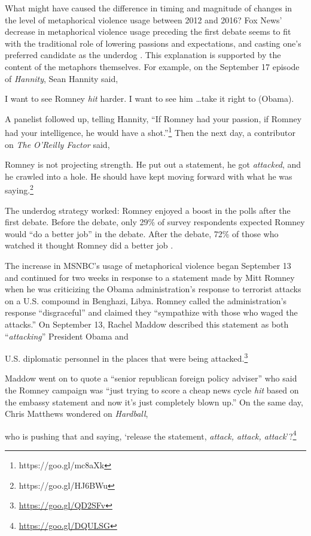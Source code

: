 What might have caused the difference in timing and magnitude of changes in
the level of metaphorical violence usage between 2012 and 2016? Fox News' 
decrease in metaphorical violence usage preceding the first debate seems to
fit with the traditional role of lowering passions and expectations, and 
casting one's preferred candidate as the underdog \cite{Schroeder2008}. 
This explanation is supported by the content of the metaphors themselves. For example, on
the September 17 episode of \emph{Hannity}, Sean Hannity said, 
\begin{exe}
  \ex I want to see Romney {\em hit} harder. I want to see him \ldots take it right to (Obama).
\end{exe}
A panelist followed up, telling Hannity, ``If Romney had your passion, if
Romney had your intelligence, he would have a shot.''\footnote{https://goo.gl/mc8aXk}
Then the next day, a contributor on \emph{The O'Reilly Factor} said,
\begin{exe}
  \ex Romney is not projecting strength. He put out a statement, he got {\em attacked}, 
   and he crawled into a hole. He should have kept moving forward with what he was saying.\footnote{https://goo.gl/HJ6BWu} 
\end{exe}
The underdog strategy worked: Romney enjoyed a boost in the polls
after the first debate. Before the debate, only 29\% of survey respondents
expected Romney would ``do a better job'' in the debate. After the debate,
72\% of those who watched it thought Romney did a better job \cite{Pew2012}.

The increase in MSNBC's usage of metaphorical violence began September
13 and continued for two weeks in response to a statement made
by Mitt Romney when he was criticizing the Obama administration's response to terrorist 
attacks on a U.S. compound in Benghazi, Libya. 
Romney called the administration's response ``disgraceful'' and 
claimed they ``sympathize with those who waged the attacks.''
On September 13, Rachel Maddow described this statement as both ``\emph{attacking}''
President Obama and 
\begin{exe}
   U.S. diplomatic personnel in the places that were
being attacked.\footnote{\url{https://goo.gl/QD2SFv}} 
\end{exe}
Maddow went on to quote a 
``senior republican foreign policy adviser'' who said the Romney campaign was
``just trying to score a cheap news cycle \emph{hit} based on the embassy statement
and now it's just completely blown up.'' On the same day, Chris Matthews
wondered on \emph{Hardball}, 
\begin{exe}
  \ex who is pushing that and saying, `release the
statement, \emph{attack, attack, attack}'?\footnote{\url{https://goo.gl/DQULSG}} 
\end{exe}

